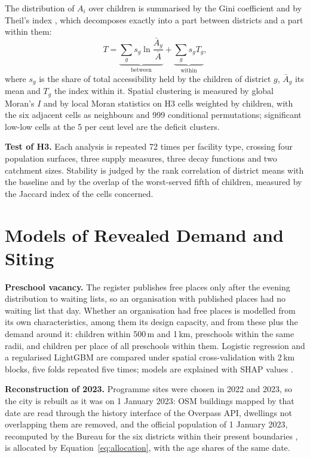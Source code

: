The distribution of $A_i$ over children is summarised by the Gini coefficient and by Theil's index \cite{theil1967}, which decomposes exactly into a part between districts and a part within them:
\begin{equation}
T = \underbrace{\sum_g s_g \ln \frac{\bar A_g}{\bar A}}_{\text{between}} + \underbrace{\sum_g s_g T_g}_{\text{within}},
\label{eq:theil}
\end{equation}
where $s_g$ is the share of total accessibility held by the children of district $g$, $\bar A_g$ its mean and $T_g$ the index within it. Spatial clustering is measured by global Moran's $I$ \cite{moran1950} and by local Moran statistics \cite{anselin1995} on H3 cells weighted by children, with the six adjacent cells as neighbours and 999 conditional permutations; significant low-low cells at the 5 per cent level are the deficit clusters.

\textbf{Test of H3.} Each analysis is repeated 72 times per facility type, crossing four population surfaces, three supply measures, three decay functions and two catchment sizes. Stability is judged by the rank correlation of district means with the baseline and by the overlap of the worst-served fifth of children, measured by the Jaccard index of the cells concerned.

\section{Models of Revealed Demand and Siting}
\label{sec:siting-methods}

\textbf{Preschool vacancy.} The register publishes free places only after the evening distribution to waiting lists, so an organisation with published places had no waiting list that day. Whether an organisation had free places is modelled from its own characteristics, among them its design capacity, and from these plus the demand around it: children within 500\,m and 1\,km, preschools within the same radii, and children per place of all preschools within them. Logistic regression and a regularised LightGBM are compared under spatial cross-validation with 2\,km blocks, five folds repeated five times; models are explained with SHAP values \cite{lundberg2017}.

\textbf{Reconstruction of 2023.} Programme sites were chosen in 2022 and 2023, so the city is rebuilt as it was on 1 January 2023: OSM buildings mapped by that date are read through the history interface of the Overpass API, dwellings not overlapping them are removed, and the official population of 1 January 2023, recomputed by the Bureau for the six districts within their present boundaries \cite{statages2026}, is allocated by Equation~\eqref{eq:allocation}, with the age shares of the same date.

